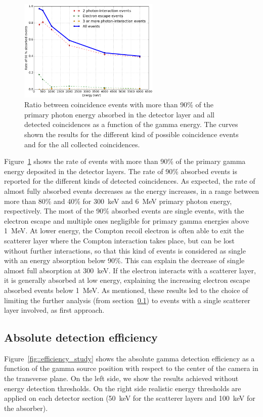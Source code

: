 \begin{figure} [!hbtp]	
\centering
\includegraphics[width=0.6\textwidth]{./Figure/new/90absFracVSenergy_hadronth.png}
\caption{Ratio between coincidence events with more than 90\% of the primary photon energy absorbed in the detector layer and all detected coincidences as a function of the gamma energy. The curves shown the results for the different kind of possible coincidence events and for the all collected coincidences.}
\label{fig::rate_full_abs}
\end{figure}

Figure~\ref{fig::rate_full_abs} shows the rate of events with more than 90\% of the primary gamma energy deposited in the detector layers. The rate of 90\% absorbed events is reported for the different kinds of detected coincidences. As expected, the rate of almost fully absorbed events decreases as the energy increases, in a range between more than 80\% and 40\% for 300~keV and 6~MeV primary photon energy, respectively. The most of the 90\% absorbed events are single events, with the electron escape and multiple ones negligible for primary gamma energies above 1~MeV. At lower energy, the Compton recoil electron is often able to exit the scatterer layer where the Compton interaction takes place, but can be lost without further interactions, so that this kind of events is considered as single with an energy absorption below 90\%. This can explain the decrease of single almost full absorption at 300~keV. If the electron interacts with a scatterer layer, it is generally absorbed at low energy, explaining the increasing electron escape absorbed events below 1~MeV. 
As mentioned, these results led to the choice of limiting the further analysis (from section~\ref{Results::efficiency}) to events with a single scatterer layer involved, as first approach.
 
 \subsection{Absolute detection efficiency}
\label{Results::efficiency}
Figure~\ref{fig::efficiency_study} shows the absolute gamma detection efficiency as a function of the gamma source position with respect to the center of the camera in the transverse plane. On the left side, we show the results achieved without energy detection thresholds. On the right side realistic energy thresholds are applied on each detector section (50~keV for the scatterer layers and 100~keV for the absorber).

